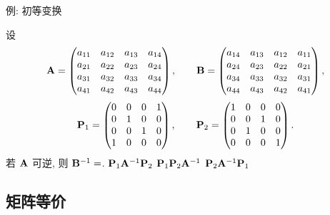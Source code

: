 \begin{frame}{例: 初等变换}
	\onslide<+->
	\begin{exercise}
		设\[{\mathbf{A}}=\begin{pmatrix}
			a_{11}&a_{12}&a_{13}&a_{14}\\
			a_{21}&a_{22}&a_{23}&a_{24}\\
			a_{31}&a_{32}&a_{33}&a_{34}\\
			a_{41}&a_{42}&a_{43}&a_{44}
	\end{pmatrix},\qquad{\mathbf{B}}=\begin{pmatrix}
		a_{14}&a_{13}&a_{12}&a_{11}\\
		a_{24}&a_{23}&a_{22}&a_{21}\\
		a_{34}&a_{33}&a_{32}&a_{31}\\
		a_{44}&a_{43}&a_{42}&a_{41}
	\end{pmatrix},\]\[{\mathbf{P}}_1=\begin{pmatrix}
		0&0&0&1\\
		0&1&0&0\\
		0&0&1&0\\
		1&0&0&0
	\end{pmatrix},\qquad{\mathbf{P}}_2=\begin{pmatrix}
		1&0&0&0\\
		0&0&1&0\\
		0&1&0&0\\
		0&0&0&1
	\end{pmatrix}.\]
	若 ${\mathbf{A}}$ 可逆, 则 ${\mathbf{B}}^{-1}=$.
	{${\mathbf{P}}_1{\mathbf{A}}^{-1}{\mathbf{P}}_2$}%
	{${\mathbf{P}}_1{\mathbf{P}}_2{\mathbf{A}}^{-1}$}%
	{${\mathbf{P}}_2{\mathbf{A}}^{-1}{\mathbf{P}}_1$}
	\end{exercise}
\end{frame}


\subsection{矩阵等价}

